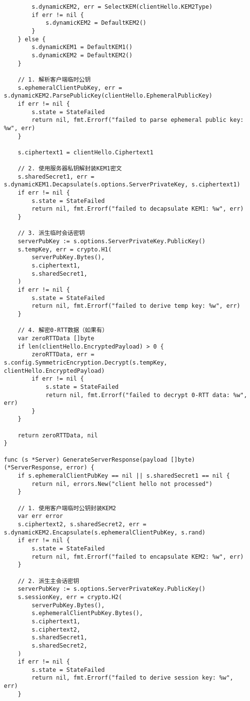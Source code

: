 \begin{verbatim}
        s.dynamicKEM2, err = SelectKEM(clientHello.KEM2Type)
        if err != nil {
            s.dynamicKEM2 = DefaultKEM2()
        }
    } else {
        s.dynamicKEM1 = DefaultKEM1()
        s.dynamicKEM2 = DefaultKEM2()
    }

    // 1. 解析客户端临时公钥
    s.ephemeralClientPubKey, err = s.dynamicKEM2.ParsePublicKey(clientHello.EphemeralPublicKey)
    if err != nil {
        s.state = StateFailed
        return nil, fmt.Errorf("failed to parse ephemeral public key: %w", err)
    }

    s.ciphertext1 = clientHello.Ciphertext1

    // 2. 使用服务器私钥解封装KEM1密文
    s.sharedSecret1, err = s.dynamicKEM1.Decapsulate(s.options.ServerPrivateKey, s.ciphertext1)
    if err != nil {
        s.state = StateFailed
        return nil, fmt.Errorf("failed to decapsulate KEM1: %w", err)
    }

    // 3. 派生临时会话密钥
    serverPubKey := s.options.ServerPrivateKey.PublicKey()
    s.tempKey, err = crypto.H1(
        serverPubKey.Bytes(),
        s.ciphertext1,
        s.sharedSecret1,
    )
    if err != nil {
        s.state = StateFailed
        return nil, fmt.Errorf("failed to derive temp key: %w", err)
    }

    // 4. 解密0-RTT数据（如果有）
    var zeroRTTData []byte
    if len(clientHello.EncryptedPayload) > 0 {
        zeroRTTData, err = s.config.SymmetricEncryption.Decrypt(s.tempKey, clientHello.EncryptedPayload)
        if err != nil {
            s.state = StateFailed
            return nil, fmt.Errorf("failed to decrypt 0-RTT data: %w", err)
        }
    }

    return zeroRTTData, nil
}

func (s *Server) GenerateServerResponse(payload []byte) (*ServerResponse, error) {
    if s.ephemeralClientPubKey == nil || s.sharedSecret1 == nil {
        return nil, errors.New("client hello not processed")
    }

    // 1. 使用客户端临时公钥封装KEM2
    var err error
    s.ciphertext2, s.sharedSecret2, err = s.dynamicKEM2.Encapsulate(s.ephemeralClientPubKey, s.rand)
    if err != nil {
        s.state = StateFailed
        return nil, fmt.Errorf("failed to encapsulate KEM2: %w", err)
    }

    // 2. 派生主会话密钥
    serverPubKey := s.options.ServerPrivateKey.PublicKey()
    s.sessionKey, err = crypto.H2(
        serverPubKey.Bytes(),
        s.ephemeralClientPubKey.Bytes(),
        s.ciphertext1,
        s.ciphertext2,
        s.sharedSecret1,
        s.sharedSecret2,
    )
    if err != nil {
        s.state = StateFailed
        return nil, fmt.Errorf("failed to derive session key: %w", err)
    }


\end{verbatim}
